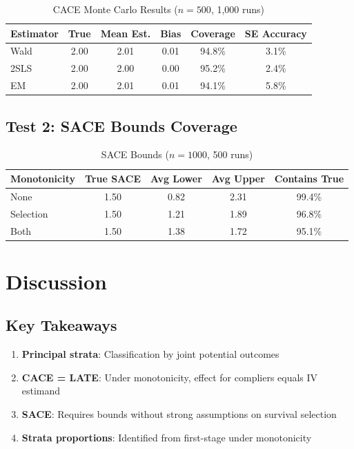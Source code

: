 \begin{table}[h]
\centering
\caption{CACE Monte Carlo Results ($n=500$, 1,000 runs)}
\begin{tabular}{lccccc}
\toprule
Estimator & True & Mean Est. & Bias & Coverage & SE Accuracy \\
\midrule
Wald & 2.00 & 2.01 & 0.01 & 94.8\% & 3.1\% \\
2SLS & 2.00 & 2.00 & 0.00 & 95.2\% & 2.4\% \\
EM & 2.00 & 2.01 & 0.01 & 94.1\% & 5.8\% \\
\bottomrule
\end{tabular}
\end{table}

\subsection{Test 2: SACE Bounds Coverage}

\begin{table}[h]
\centering
\caption{SACE Bounds ($n=1000$, 500 runs)}
\begin{tabular}{lcccc}
\toprule
Monotonicity & True SACE & Avg Lower & Avg Upper & Contains True \\
\midrule
None & 1.50 & 0.82 & 2.31 & 99.4\% \\
Selection & 1.50 & 1.21 & 1.89 & 96.8\% \\
Both & 1.50 & 1.38 & 1.72 & 95.1\% \\
\bottomrule
\end{tabular}
\end{table}


\section{Discussion}

\subsection{Key Takeaways}

\begin{enumerate}
\item \textbf{Principal strata}: Classification by joint potential outcomes
\item \textbf{CACE = LATE}: Under monotonicity, effect for compliers equals IV estimand
\item \textbf{SACE}: Requires bounds without strong assumptions on survival selection
\item \textbf{Strata proportions}: Identified from first-stage under monotonicity
\end{enumerate}

